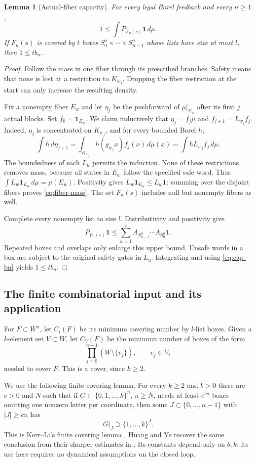 \documentclass[11pt,reqno]{amsart}
\numberwithin{equation}{section}
\newtheorem{lemma}[theorem]{Lemma}
\theoremstyle{definition}
\theoremstyle{definition}
\newcommand{\one}{\mathbf 1}
\begin{document}
\begin{lemma}[Actual-fiber capacity]\label{lem:fiber-cap}
For every legal Borel feedback and every $n\ge1$,
\begin{equation}\label{eq:fiber-mass}
 1\le\int P_{F_n(s)}\one\,d\mu.
\end{equation}
If $F_n(s)$ is covered by $t$ boxes
$S^a_0\times\cdots\times S^a_{n-1}$ whose lists have size at
most $l$, then $1\le t b_n$.
\end{lemma}
\begin{proof}
Follow the mass in one fiber through its prescribed branches. Safety
means that none is lost at a restriction to $K_{w_j}$. Dropping the
fiber restriction at the start can only increase the resulting density.

Fix a nonempty fiber $E_w$ and let $\eta_j$ be the pushforward
of $\mu|_{E_w}$ after its first $j$ actual blocks. Set
$f_0=\one_{E_w}$. We claim inductively that
$\eta_j=f_j\mu$ and $f_{j+1}=L_{w_j}f_j$. Indeed,
$\eta_j$ is concentrated on $K_{w_j}$, and for every bounded Borel $h$,
\[
 \int h\,d\eta_{j+1}
 =\int_{K_{w_j}}h(g_{w_j}x)f_j(x)\,d\mu(x)
 =\int hL_{w_j}f_j\,d\mu.
\]
The boundedness of each $L_u$ permits the induction. None of these
restrictions removes mass, because all states in $E_w$ follow the
specified safe word. Thus $\int L_w\one_{E_w}\,d\mu=\mu(E_w)$.
Positivity gives $L_w\one_{E_w}\le L_w\one$; summing over the
disjoint fibers proves \eqref{eq:fiber-mass}. The set $F_n(s)$ includes
null but nonempty fibers as well.

Complete every nonempty list to size $l$. Distributivity and positivity
give
\[
 P_{F_n(s)}\one\le\sum_{a=1}^t
 A_{S^a_{n-1}}\cdots A_{S^a_0}\one.
\]
Repeated boxes and overlaps only enlarge this upper bound. Unsafe
words in a box are subject to the original safety gates in $L_u$.
Integrating and using \eqref{eq:cap-bn} yields $1\le tb_n$.
\end{proof}

\subsection{The finite combinatorial input and its application}
For $F\subset W^n$, let $C_l(F)$ be its minimum covering number by
$l$-list boxes. Given a $k$-element set $V\subset W$, let $C_V(F)$
be the minimum number of boxes of the form
\[
 \prod_{j=0}^{n-1}(W\setminus\{v_j\}),\qquad v_j\in V,
\]
needed to cover $F$. This is a cover, since $k\ge2$.

We use the following finite covering lemma. For every
$k\ge2$ and $b>0$ there are $c>0$ and $N$ such that if
$G\subset\{0,1,\ldots,k\}^n$, $n\ge N$, needs at least
$e^{bn}$ boxes omitting one nonzero letter per coordinate, then some
$J\subset\{0,\ldots,n-1\}$ with $|J|\ge cn$ has
\begin{equation}\label{eq:HY-cube}
 G|_J\supset\{1,\ldots,k\}^{J}.
\end{equation}
This is Kerr--Li's finite covering lemma
\cite[Lemma~3.3]{KL2007}. Huang and Ye recover the same conclusion
from their sharper estimates in \cite[Lemma~4.1 and Remark~4.2,
pp.~1701--1705]{HuangYe2009}. Its constants depend only on $b,k$;
its use here requires no dynamical assumptions on the closed loop.
\end{document}
